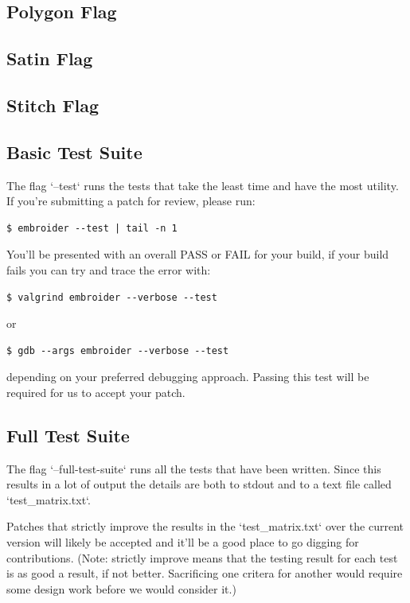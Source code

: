 \documentclass[11pt]{report}
\begin{document}
\subsection{Polygon Flag}

\subsection{Satin Flag}

\subsection{Stitch Flag}

\subsection{Basic Test Suite}

The flag `--test` runs the tests that take the least time and have the most utility. If you're submitting a patch for review, please run:

\begin{lstlisting}
$ embroider --test | tail -n 1
\end{lstlisting}

You'll be presented with an overall PASS or FAIL for your build,
if your build fails you can try and trace the error with:

\begin{lstlisting}
$ valgrind embroider --verbose --test
\end{lstlisting}

or

\begin{lstlisting}
$ gdb --args embroider --verbose --test
\end{lstlisting}

depending on your preferred debugging approach. Passing this test
will be required for us to accept your patch.

\subsection{Full Test Suite}

The flag `--full-test-suite` runs all the tests that have been written.
Since this results in a lot of output the details are both to stdout
and to a text file called `test\_matrix.txt`.

Patches that strictly improve the results in the `test\_matrix.txt` over
the current version will likely be accepted and it'll be a good place
to go digging for contributions. (Note: strictly improve means that
the testing result for each test is as good a result, if not better.
Sacrificing one critera for another would require some design work
before we would consider it.)
\end{document}

